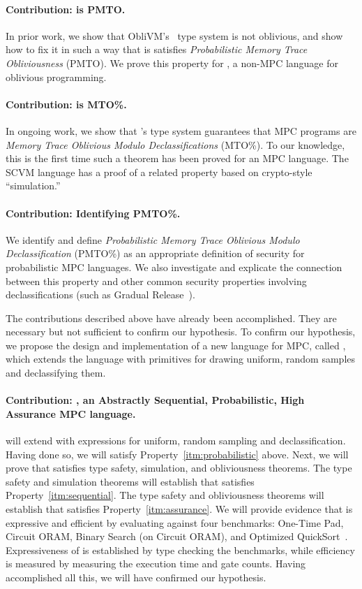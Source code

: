 \paragraph{Contribution: \obliv is PMTO.} In prior work, we show that ObliVM's~\cite{todo} type system is not oblivious,
and show how to fix it in such a way that is satisfies \emph{Probabilistic Memory Trace Obliviousness} (PMTO).
We prove this property for \obliv, a non-MPC language for oblivious programming.

\paragraph{Contribution: \mpc is MTO\%.} In ongoing work, we show that \mpc's type system guarantees that MPC programs are
\emph{Memory Trace Oblivious Modulo Declassifications} (MTO\%). To our knowledge, this is the first time such a theorem has been
proved for an MPC language. The SCVM language has a proof of a related property based on crypto-style ``simulation.''

\paragraph{Contribution: Identifying PMTO\%.} We identify and define \emph{Probabilistic Memory Trace Oblivious Modulo Declassification}
(PMTO\%) as an appropriate definition of security for probabilistic MPC languages. We also investigate and explicate the connection between
this property and other common security properties involving declassifications (such as Gradual Release~\cite{todo}).

The contributions described above have already been accomplished. They are necessary but not sufficient to confirm our hypothesis.
To confirm our hypothesis, we propose the design and implementation of a new language for MPC, called \lang, which extends the \mpc
language with primitives for drawing uniform, random samples and declassifying them.

\paragraph{Contribution: \lang, an \textbf{Abstractly Sequential}, \textbf{Probabilistic}, \textbf{High Assurance} MPC language.}
\lang will extend \mpc with expressions for uniform, random sampling and declassification. Having done so, we will satisfy
Property~\ref{itm:probabilistic} above. Next, we will prove that \lang satisfies type safety, simulation, and obliviousness theorems.
The type safety and simulation theorems will establish that \lang satisfies Property~\ref{itm:sequential}. The type safety and obliviousness
theorems will establish that \lang satisfies Property~\ref{itm:assurance}. We will provide evidence that \lang is expressive and efficient
by evaluating \lang against four benchmarks: One-Time Pad, Circuit ORAM, Binary Search (on Circuit ORAM), and Optimized QuickSort~\cite{}.
Expressiveness of \lang is established by type checking the benchmarks, while efficiency is measured by measuring the execution time and
gate counts. Having accomplished all this, we will have confirmed our hypothesis.

